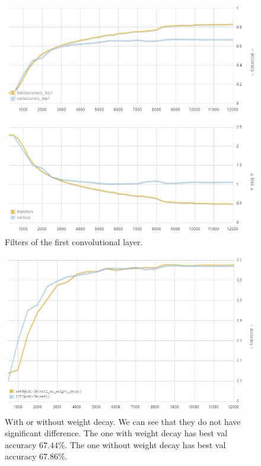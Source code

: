 \begin{figure}[ht]
\centering
    \includegraphics[width=0.99\linewidth]{fig/curve1}
    \caption{\small
    Filters of the first convolutional layer.}
    \label{fig:2}
\end{figure}

\begin{figure}[ht]
\centering
    \includegraphics[width=0.9\linewidth]{fig/nodecayacc}
    \caption{\small
    With or without weight decay.
    We can see that they do not have significant difference.
    The one with weight decay has best val accuracy $67.44\%$.
    The one without weight decay has best val accuracy $67.86\%$.}
    \label{fig:3}
\end{figure}


